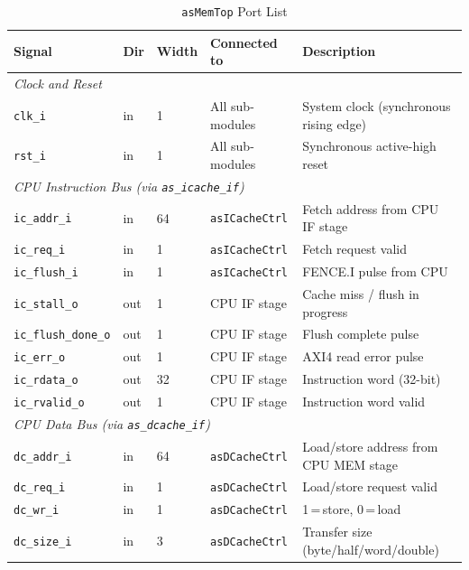 \begin{table}[H]
\caption{\texttt{asMemTop} Port List}
\label{tab:asMemTopPorts}
\centering
\begin{tabularx}{\textwidth}{|l |l |l |l |X|}
  \hline
  Signal & Dir & Width & Connected to & Description \\
  \hline
  \hline
  \multicolumn{5}{|l|}{\textit{Clock and Reset}} \\
  \hline
  \texttt{clk\_i}  & in & 1 & All sub-modules & System clock (synchronous rising edge) \\
  \hline
  \texttt{rst\_i}  & in & 1 & All sub-modules & Synchronous active-high reset \\
  \hline
  \multicolumn{5}{|l|}{\textit{CPU Instruction Bus (via \texttt{as\_icache\_if})}} \\
  \hline
  \texttt{ic\_addr\_i}        & in  & 64 & \texttt{asICacheCtrl} & Fetch address from CPU IF stage \\
  \hline
  \texttt{ic\_req\_i}         & in  & 1  & \texttt{asICacheCtrl} & Fetch request valid \\
  \hline
  \texttt{ic\_flush\_i}       & in  & 1  & \texttt{asICacheCtrl} & FENCE.I pulse from CPU \\
  \hline
  \texttt{ic\_stall\_o}       & out & 1  & CPU IF stage          & Cache miss / flush in progress \\
  \hline
  \texttt{ic\_flush\_done\_o} & out & 1  & CPU IF stage          & Flush complete pulse \\
  \hline
  \texttt{ic\_err\_o}         & out & 1  & CPU IF stage          & AXI4 read error pulse \\
  \hline
  \texttt{ic\_rdata\_o}       & out & 32 & CPU IF stage          & Instruction word (32-bit) \\
  \hline
  \texttt{ic\_rvalid\_o}      & out & 1  & CPU IF stage          & Instruction word valid \\
  \hline
  \multicolumn{5}{|l|}{\textit{CPU Data Bus (via \texttt{as\_dcache\_if})}} \\
  \hline
  \texttt{dc\_addr\_i}        & in  & 64 & \texttt{asDCacheCtrl} & Load/store address from CPU MEM stage \\
  \hline
  \texttt{dc\_req\_i}         & in  & 1  & \texttt{asDCacheCtrl} & Load/store request valid \\
  \hline
  \texttt{dc\_wr\_i}          & in  & 1  & \texttt{asDCacheCtrl} & 1\,=\,store, 0\,=\,load \\
  \hline
  \texttt{dc\_size\_i}        & in  & 3  & \texttt{asDCacheCtrl} & Transfer size (byte/half/word/double) \\

\end{tabularx}
\end{table}
